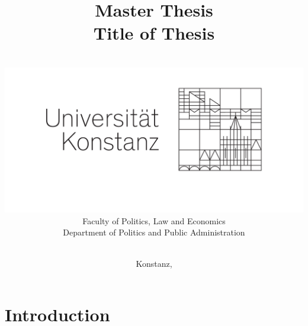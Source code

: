 \documentclass[12pt,oneside,a4paper]{article}
\begin{document}
\title{\textbf{Master Thesis \\
\bigskip
\bigskip
Title of Thesis}}
\author{\\
        \includegraphics[scale=0.3]{fig/00_logo_kn.pdf}
		\\
    	Faculty of Politics, Law and Economics \\
		Department of Politics and Public Administration \\
		\\
		}
\date{Konstanz, \the\year}

\maketitle
\thispagestyle{empty}

\newpage

%

\thispagestyle{empty}
\tableofcontents
\newpage


\setcounter{page}{1}
%
\newpage

\listoffigures
\newpage

\listoftables
\newpage


\section{Introduction}
\setcounter{page}{1}
%
\end{document}
